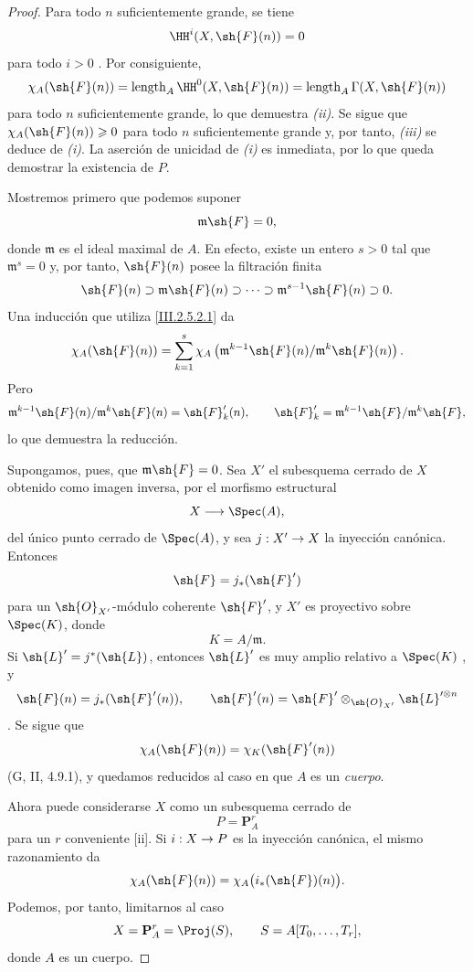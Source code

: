 \documentclass[oneside]{amsart}
\makeatletter
\renewcommand{\geq}{\geqslant}
\newcommand{\ega@arrow}[2]{\mathchoice{#1}{#2}{#2}{#2}}
\renewcommand{\to}{\ega@arrow{\longrightarrow}{\rightarrow}}
\newcommand{\oldpage}[2][]{{\marginnote{\normalfont\textbf{#1}~|~#2}}\ignorespaces}
\makeatother
\begin{document}
\begin{proof}
Para todo $n$ suficientemente grande, se tiene
\[
  \HH^i(X,\sh{F}(n))=0
\]
para todo $i>0$ .
\oldpage[III]{110}
Por consiguiente,
\[
  \chi_A(\sh{F}(n))
  =
  \operatorname{length}_A\HH^0(X,\sh{F}(n))
  =
  \operatorname{length}_A\Gamma(X,\sh{F}(n))
\]
para todo $n$ suficientemente grande, lo que demuestra \emph{(ii)}.
Se sigue que $\chi_A(\sh{F}(n))\geq0$ para todo $n$ suficientemente grande y, por tanto, \emph{(iii)} se deduce de \emph{(i)}.
La aserción de unicidad de \emph{(i)} es inmediata, por lo que queda demostrar la existencia de $P$.

Mostremos primero que podemos suponer
\[
  \mathfrak{m}\sh{F}=0,
\]
donde $\mathfrak{m}$ es el ideal maximal de $A$.
En efecto, existe un entero $s>0$ tal que $\mathfrak{m}^s=0$ y, por tanto, $\sh{F}(n)$ posee la filtración finita
\[
  \sh{F}(n)
  \supset\mathfrak{m}\sh{F}(n)
  \supset\cdots
  \supset\mathfrak{m}^{s-1}\sh{F}(n)
  \supset0.
\]
Una inducción que utiliza \eqref{III.2.5.2.1} da
\[
  \chi_A(\sh{F}(n))
  =
  \sum_{k=1}^{s}
  \chi_A\left(
    \mathfrak{m}^{k-1}\sh{F}(n)/
    \mathfrak{m}^{k}\sh{F}(n)
  \right).
\]
Pero
\[
  \mathfrak{m}^{k-1}\sh{F}(n)/
  \mathfrak{m}^{k}\sh{F}(n)
  =
  \sh{F}'_k(n),
  \qquad
  \sh{F}'_k=
  \mathfrak{m}^{k-1}\sh{F}/\mathfrak{m}^{k}\sh{F},
\]
lo que demuestra la reducción.

Supongamos, pues, que $\mathfrak{m}\sh{F}=0$.
Sea $X'$ el subesquema cerrado de $X$ obtenido como imagen inversa, por el morfismo estructural
\[
  X\longrightarrow\Spec(A),
\]
del único punto cerrado de $\Spec(A)$, y sea $j:X'\to X$ la inyección canónica.
Entonces
\[
  \sh{F}=j_*(\sh{F}')
\]
para un $\sh{O}_{X'}$-módulo coherente $\sh{F}'$, y $X'$ es proyectivo sobre $\Spec(K)$, donde
\[
  K=A/\mathfrak{m}.
\]
Si $\sh{L}'=j^*(\sh{L})$, entonces $\sh{L}'$ es muy amplio relativo a $\Spec(K)$ , y
\[
  \sh{F}(n)=j_*(\sh{F}'(n)),
  \qquad
  \sh{F}'(n)
  =
  \sh{F}'\otimes_{\sh{O}_{X'}}\sh{L}'^{\otimes n}
\]
.
Se sigue que
\[
  \chi_A(\sh{F}(n))
  =
  \chi_K(\sh{F}'(n))
\]
(G, II, 4.9.1), y quedamos reducidos al caso en que $A$ es un \emph{cuerpo}.

Ahora puede considerarse $X$ como un subesquema cerrado de
\[
  P=\mathbf{P}_A^r
\]
para un $r$ conveniente [ii].
Si $i:X\to P$ es la inyección canónica, el mismo razonamiento da
\[
  \chi_A(\sh{F}(n))
  =
  \chi_A\bigl(i_*(\sh{F})(n)\bigr).
\]
Podemos, por tanto, limitarnos al caso
\[
  X=\mathbf{P}_A^r=\Proj(S),
  \qquad
  S=A[T_0,\ldots,T_r],
\]
donde $A$ es un cuerpo.


\end{proof}
\end{document}
